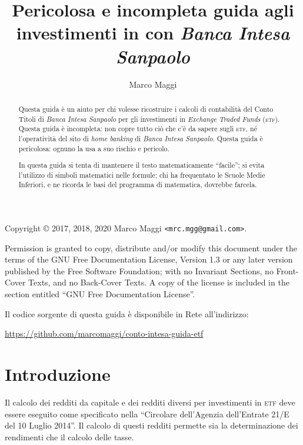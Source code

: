 \documentclass[12pt,a4paper]{article}
\author{Marco Maggi}
\title{Pericolosa e incompleta guida agli investimenti in \Etf{} con \emph{Banca Intesa Sanpaolo}}
\newcommand{\Parentesi}[1]{(#1)}
\newcommand{\Etf}[1]{\textsc{etf}}
\begin{document}
\maketitle

\begin{abstract}
  \noindent
  Questa guida è un  aiuto per chi volesse ricostruire i calcoli di  contabilità del Conto Titoli di
  \emph{Banca   Intesa   Sanpaolo}   per   gli  investimenti   in   \emph{Exchange   Traded   Funds}
  \Parentesi{\Etf{}}.   Questa guida  è incompleta:  non copre  tutto ciò  che c'è  da sapere  sugli
  \Etf{}, né l'operatività del sito di  \emph{home banking} di \emph{Banca Intesa Sanpaolo}.  Questa
  guida è pericolosa: ognuno la usa a suo rischio e pericolo.

  In questa guida si tenta di mantenere  il testo matematicamente ``facile''; si evita l'utilizzo di
  simboli matematici nelle  formule; chi ha frequentato  le Scuole Medie Inferiori, e  ne ricorda le
  basi del programma di matematica, dovrebbe farcela.
\end{abstract}

\tableofcontents

\newpage{}

\noindent
Copyright \copyright{} 2017, 2018, 2020 Marco Maggi \texttt{<mrc.mgg@gmail.com>}.

Permission is  granted to copy, distribute  and/or modify this document  under the terms of  the GNU
Free  Documentation License,  Version  1.3 or  any  later  version published  by  the Free  Software
Foundation; with no  Invariant Sections, no Front-Cover  Texts, and no Back-Cover Texts.   A copy of
the license is included in the section entitled ``GNU Free Documentation License''.

Il codice sorgente di questa guida è disponibile in Rete all'indirizzo:
\begin{center}
  \url{https://github.com/marcomaggi/conto-intesa-guida-etf}
\end{center}

\newpage{}

\section{Introduzione}


Il calcolo  dei redditi da  capitale e dei  redditi diversi per  investimenti in \Etf{}  deve essere
eseguito come specificato nella ``Circolare dell'Agenzia dell'Entrate 21/E del 10 Luglio 2014''.  Il
calcolo di questi redditi permette sia la determinazione dei rendimenti che il calcolo delle tasse.
\end{document}
